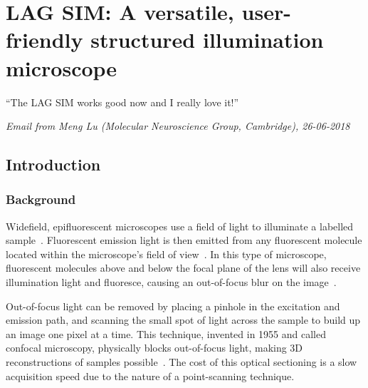 \chapter{LAG SIM: A versatile, user-friendly structured illumination microscope} \label{chap:LAGSIM}



\ifpdf
    \graphicspath{{Chapter2/Figs/Raster/}{Chapter2/Figs/PDF/}{Chapter2/Figs/}}
\else
    \graphicspath{{Chapter2/Figs/Vector/}{Chapter2/Figs/}}
\fi

``The LAG SIM works good now and I really love it!''

\textit{Email from Meng Lu (Molecular Neuroscience Group, Cambridge), 26-06-2018}

\section{Introduction} \label{sec:simintro}
\subsection{Background}
Widefield, epifluorescent microscopes use a field of light to illuminate a labelled sample~\cite[\textit{ch. 2}]{lakowicz2007principles}. 
Fluorescent emission light is then emitted from any fluorescent molecule located within the microscope's field of view~\cite{pawley2012handbook}. 
In this type of microscope, fluorescent molecules above and below the focal plane of the lens will also receive illumination light and fluoresce, causing an out-of-focus blur on the image~\cite{wilson1984theory}.

Out-of-focus light can be removed by placing a pinhole in the excitation and emission path, and scanning the small spot of light across the sample to build up an image one pixel at a time. 
This technique, invented in 1955 and called confocal microscopy, physically blocks out-of-focus light, making 3D reconstructions of samples possible~\cite{marvin1961microscopy}. 
The cost of this optical sectioning is a slow acquisition speed due to the nature of a point-scanning technique. 

